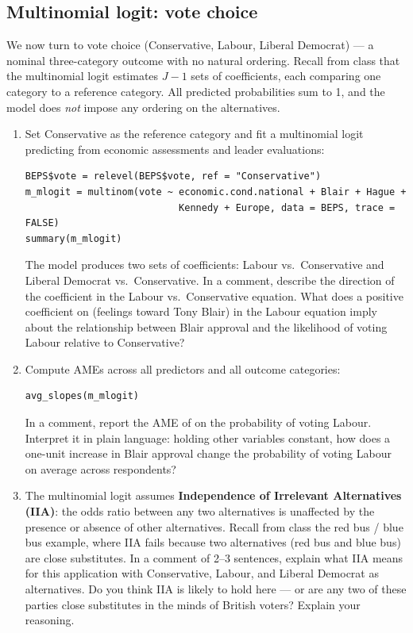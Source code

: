 \subsection{Multinomial logit: vote choice}

We now turn to vote choice (Conservative, Labour, Liberal Democrat) --- a nominal three-category outcome with no natural ordering. Recall from class that the multinomial logit estimates $J - 1$ sets of coefficients, each comparing one category to a reference category. All predicted probabilities sum to 1, and the model does \textit{not} impose any ordering on the alternatives.

\begin{enumerate}[label=\alph*)]

  \item Set Conservative as the reference category and fit a multinomial logit predicting  from economic assessments and leader evaluations:
  \begin{lstlisting}
BEPS$vote = relevel(BEPS$vote, ref = "Conservative")
m_mlogit = multinom(vote ~ economic.cond.national + Blair + Hague +
                           Kennedy + Europe, data = BEPS, trace = FALSE)
summary(m_mlogit)
  \end{lstlisting}
  The model produces two sets of coefficients: Labour vs.\ Conservative and Liberal Democrat vs.\ Conservative. In a comment, describe the direction of the  coefficient in the Labour vs.\ Conservative equation. What does a positive coefficient on  (feelings toward Tony Blair) in the Labour equation imply about the relationship between Blair approval and the likelihood of voting Labour relative to Conservative?

  \item Compute AMEs across all predictors and all outcome categories:
  \begin{lstlisting}
avg_slopes(m_mlogit)
  \end{lstlisting}
  In a comment, report the AME of  on the probability of voting Labour. Interpret it in plain language: holding other variables constant, how does a one-unit increase in Blair approval change the probability of voting Labour on average across respondents?

  \item The multinomial logit assumes \textbf{Independence of Irrelevant Alternatives (IIA)}: the odds ratio between any two alternatives is unaffected by the presence or absence of other alternatives. Recall from class the red bus / blue bus example, where IIA fails because two alternatives (red bus and blue bus) are close substitutes. In a comment of 2--3 sentences, explain what IIA means for this application with Conservative, Labour, and Liberal Democrat as alternatives. Do you think IIA is likely to hold here --- or are any two of these parties close substitutes in the minds of British voters? Explain your reasoning.

\end{enumerate}

